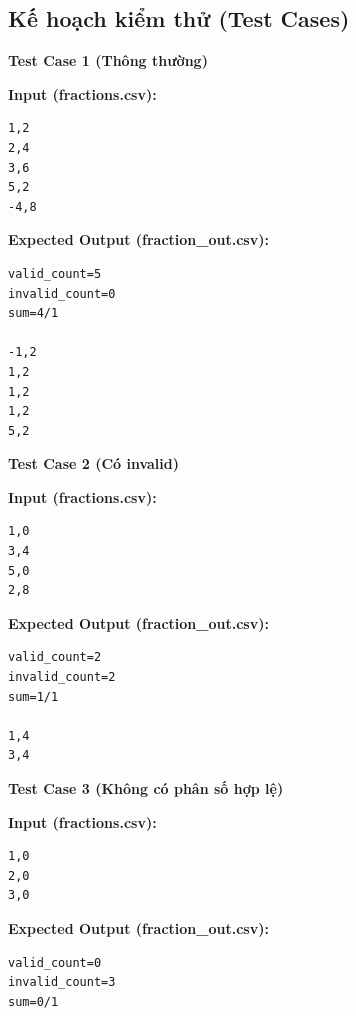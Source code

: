 \subsection{Kế hoạch kiểm thử (Test Cases)}

\textbf{Test Case 1 (Thông thường)}

\textbf{Input (fractions.csv):}

\begin{lstlisting}
1,2
2,4
3,6
5,2
-4,8
\end{lstlisting}

\textbf{Expected Output (fraction\_out.csv):}

\begin{lstlisting}
valid_count=5
invalid_count=0
sum=4/1

-1,2
1,2
1,2
1,2
5,2
\end{lstlisting}

\vspace{0.5cm}

\textbf{Test Case 2 (Có invalid)}

\textbf{Input (fractions.csv):}

\begin{lstlisting}
1,0
3,4
5,0
2,8
\end{lstlisting}

\textbf{Expected Output (fraction\_out.csv):}

\begin{lstlisting}
valid_count=2
invalid_count=2
sum=1/1

1,4
3,4
\end{lstlisting}

\vspace{0.5cm}

\textbf{Test Case 3 (Không có phân số hợp lệ)}

\textbf{Input (fractions.csv):}

\begin{lstlisting}
1,0
2,0
3,0
\end{lstlisting}

\textbf{Expected Output (fraction\_out.csv):}

\begin{lstlisting}
valid_count=0
invalid_count=3
sum=0/1
\end{lstlisting}